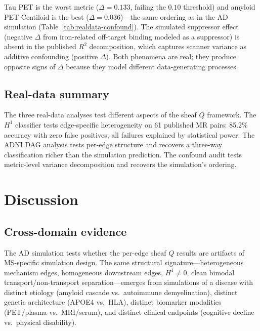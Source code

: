 \documentclass[11pt]{article}
\begin{document}
Tau PET is the worst metric ($\Delta = 0.133$, failing the $0.10$ threshold) and amyloid PET Centiloid is the best ($\Delta = 0.036$)---the same ordering as in the AD simulation (Table~\ref{tab:realdata-confound}). The simulated suppressor effect (negative $\Delta$ from iron-related off-target binding modeled as a suppressor) is absent in the published $R^2$ decomposition, which captures scanner variance as additive confounding (positive $\Delta$). Both phenomena are real; they produce opposite signs of $\Delta$ because they model different data-generating processes.

\subsection{Real-data summary}
\label{sec:realdata-summary}

The three real-data analyses test different aspects of the sheaf $Q$ framework.
The $H^1$ classifier tests edge-specific heterogeneity on 61 published MR pairs: 85.2\% accuracy with zero false positives, all failures explained by statistical power.
The ADNI DAG analysis tests per-edge structure and recovers a three-way classification richer than the simulation prediction.
The confound audit tests metric-level variance decomposition and recovers the simulation's ordering.

\section{Discussion}
\label{sec:discussion}

\subsection{Cross-domain evidence}

The AD simulation tests whether the per-edge sheaf $Q$ results are artifacts of MS-specific simulation design.
The same structural signature---heterogeneous mechanism edges, homogeneous downstream edges, $H^1 \neq 0$, clean bimodal transport/non-transport separation---emerges from simulations of a disease with distinct etiology (amyloid cascade vs.\ autoimmune demyelination), distinct genetic architecture (APOE4 vs.\ HLA), distinct biomarker modalities (PET/plasma vs.\ MRI/serum), and distinct clinical endpoints (cognitive decline vs.\ physical disability).
\end{document}
